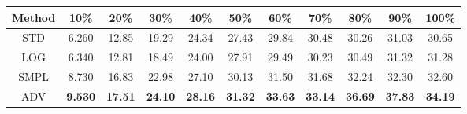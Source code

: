 \documentclass{standalone}
\begin{document}
\begin{tabular}{c|cccccccccc}
      \toprule
      Method & 10\% & 20\% & 30\% & 40\% & 50\% & 60\% & 70\% & 80\% & 90\% & 100\% \\
      \midrule
STD & 6.260 & 12.85 & 19.29 & 24.34 & 27.43 & 29.84 & 30.48 & 30.26 & 31.03 & 30.65\\
LOG & 6.340 & 12.81 & 18.49 & 24.00 & 27.91 & 29.49 & 30.23 & 30.49 & 31.32 & 31.28\\
SMPL & 8.730 & 16.83 & 22.98 & 27.10 & 30.13 & 31.50 & 31.68 & 32.24 & 32.30 & 32.60\\
ADV & \textbf{9.530} & \textbf{17.51} & \textbf{24.10} & \textbf{28.16} & \textbf{31.32} & \textbf{33.63} & \textbf{33.14} & \textbf{36.69} & \textbf{37.83} & \textbf{34.19}\\
  \bottomrule
\end{tabular}
\end{document}
